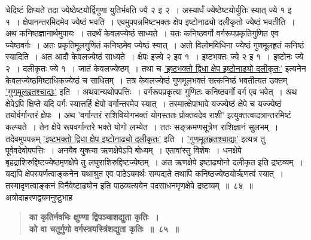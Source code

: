 \documentclass[11pt, openany]{book}
\begin{document}
\begin{sloppypar}
\noindent चेदिष्टं क्षिप्यते तदा ज्येष्ठेष्टयोर्द्विगुणा युतिर्भवति ज्ये २ इ २~। अस्यार्धं ज्येष्ठेष्टयोर्युतिः स्यात् ज्ये १ इ १~। क्षेपानन्तरमिदमेव ज्येष्ठं भवति~। एवमुपपन्नमिष्टभक्तः क्षेप इष्टोनाढ्यो दलीकृतो ज्येष्ठं भवतीति~। अथ कनिष्ठज्ञानार्थमुपायः~। तदर्थं केवलज्येष्ठं साध्यते~। यतः कनिष्ठवर्गो वर्गरूपप्रकृतिगुणित एव ज्येष्ठवर्गः~। अतः प्रकृतिमूलगुणितं कनिष्ठमेव ज्येष्ठं स्यात्~। अतो विलोमविधिना ज्येष्ठं गुणमूलहृतं कनिष्ठं स्यादिति~। अत आदौ केवलज्येष्ठं साध्यते~। क्षेपः इज्ये २ इव १~। इष्टभक्तः ज्ये २ इ १~। इष्टोनः ज्ये २~। दलीकृतः ज्ये १~। जातं केवलज्येष्ठम्~। तथा च \hyperref[6.84]{'इष्टभक्तो द्विधा क्षेप इष्टोनाढ्यो दलीकृतः'} इत्यनेन केवलज्येष्ठमिष्टाधिकज्येष्ठं च साधितम्~। तत्र केवलज्येष्ठं गुणमूलभक्तं सत्कनिष्ठं भवतीत्यत उक्तम् \hyperref[6.84]{'गुणमूलहृतश्चाद्यः'} इति~। अथवान्यथोपपत्तिः~। वर्गरूपप्रकृत्या गुणितः कनिष्ठवर्गो वर्ग एव भवेत्~। अथ क्षेपेऽपि क्षिप्ते यदि वर्गः स्यात्तर्हि क्षेपो वर्गान्तरमेव स्यात्~। तस्मात्क्षेपाभावे यज्ज्येष्ठं क्षेपे च यज्ज्येष्ठं तयोर्वर्गान्तरं क्षेपः~। अथ {\color{violet}'वर्गान्तरं राशिवियोगभक्तं योगस्ततः प्रोक्तवदेव राशी'} इत्युक्तत्वादत्रान्तरमिष्टं कल्प्यते~। तेन क्षेपे रूपवर्गान्तरे भक्ते योगो लभ्येत~। ततः सङ्क्रमणसूत्रेण राशिज्ञानं सुलभम्~। तदेवमुपपन्नम् \hyperref[6.84]{'इष्टभक्तो द्विधा क्षेप इष्टोनाढ्यो दलीकृतः'} इति~। \hyperref[6.84]{'गुणमूलहृतश्चाद्यः'} इत्यत्र तु पूर्ववदेवोपपत्तिः~। अनयैव युक्त्या ऋणक्षेपेऽपि बोध्यम्~। एतावांस्तु विशेषः~। धनक्षेपे बृहद्राशिरुद्दिष्टज्येष्ठमृणक्षेपे तु लघुराशिरुद्दिष्टज्येष्ठम्~। अत ऋणक्षेपे इष्टाढ्योनो दलीकृत इति द्रष्टव्यम्~। यद्यपि क्षेपस्यर्णत्वाङ्कनेन यथाश्रुत एव पाठेऽयमर्थः सम्पद्यते तथापि कनिष्ठज्येष्ठयोर्ऋणत्वं स्यात्~। तस्मादृणत्वाङ्कनं विनैवेष्टाढ्योन इति पाठव्यत्ययेन पदसाधनमृणक्षेपे द्रष्टव्यम्~॥~८४~॥\\

{\small अत्रोदाहरणद्वयमनुष्टुभाह\textendash }

 \label{6.85}
\begin{quote}
{\large \textbf{{\color{purple}का कृतिर्नवभिः क्षुण्णा द्विपञ्चाशद्युता कृतिः~।\\
को वा चतुर्गुणो वर्गस्त्रयस्त्रिंशद्युता कृतिः~॥~८५~॥}}}
\end{quote}


\end{sloppypar}
\end{document}
